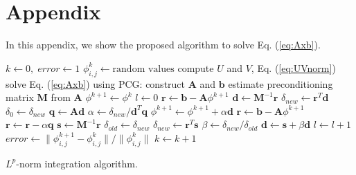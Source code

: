 \documentclass[12pt,letterpaper]{article}
\begin{document}
\appendix
\section{Appendix}\label{sec:apendice}
In this appendix, we show the proposed algorithm to solve Eq. (\ref{eq:Axb}).
\begin{algorithm}
	\DontPrintSemicolon
	\BlankLine
	$k \leftarrow 0,\;error \leftarrow 1$\;
	$\phi_{i,j}^{k}\leftarrow\text{random values}$\;
	{
		compute $U$ and $V$, Eq. (\ref{eq:UVnorm})\;
		solve Eq. (\ref{eq:Axb}) using PCG:\;
		\Begin
		{
			construct $\mathbf{A}$ and $\mathbf{b}$ \;
			estimate preconditioning matrix $\mathbf{M}$ from $\mathbf{A}$\;\label{matrizM}
			$\phi^{k+1} \leftarrow\phi^{k}$\;
			$l \leftarrow 0$\;
			$\mathbf{r}\leftarrow\mathbf{b} - \mathbf{A}\phi^{k+1}$\;
			$\mathbf{d}\leftarrow\mathbf{M}^{-1}\mathbf{r}$\;
			$\delta_{new}\leftarrow\mathbf{r}^{T}\mathbf{d}$\;
			$\delta_{0}\leftarrow\delta_{new}$\;
			{
				$\mathbf{q}\leftarrow\mathbf{A}\mathbf{d}$\;
				$\alpha\leftarrow\delta_{new} / \mathbf{d}^{T}\mathbf{q}$\;
				$\phi^{k+1} \leftarrow\phi^{k+1} + \alpha\mathbf{d}$\;
				{$\mathbf{r}\leftarrow\mathbf{b} - \mathbf{A}\phi^{k+1}$\;}
				{$\mathbf{r}\leftarrow\mathbf{r} - \alpha\mathbf{q}$\;} 
				$\mathbf{s}\leftarrow\mathbf{M}^{-1}\mathbf{r}$\;
				$\delta_{old}\leftarrow\delta_{new}$\;
				$\delta_{new}\leftarrow\mathbf{r}^{T}\mathbf{s}$\;
				$\beta\leftarrow\delta_{new} / \delta_{old}$\;
				$\mathbf{d}\leftarrow\mathbf{s} + \beta\mathbf{d}$\;
				$l\leftarrow l +1$\;  
			}
		}
		$error\leftarrow\|\phi_{i,j}^{k+1}-\phi_{i,j}^{k}\| / \|\phi_{i,j}^{k}\|$\;    
		$k\leftarrow k +1$\;  
	}
	\caption{\(L^p\)-norm integration algorithm.}\label{algoritmo}
\end{algorithm}
\end{document}
